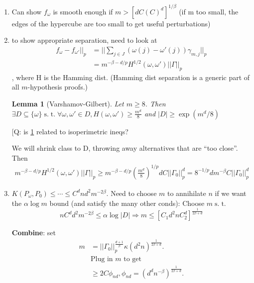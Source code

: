 \documentclass[10pt]{article}
\newtheorem{lemma}[lemma]{Lemma}
\newcommand{\st}{\ensuremath{\;\mathrm{s.}\;\mathrm{t.}\;}}
\begin{document}
\begin{enumerate}
\item Can show $f_\omega$ is smooth enough if $m>\left[dC(C)^d\right]^{1/\beta}$
(if m too small, the edges of the hypercube are too small to get useful perturbations)
\item to show appropriate separation, need to look at 
\begin{align*}
f_\omega-f_{\omega'}||_p &= ||\sum_{j\in J}(\omega(j) - \omega'(j))\gamma_{m,j}||_p\\
&= m^{-\beta-d/p}H^{1/2}(\omega,\omega')||\Gamma||_p
\end{align*}, 
where H is the Hamming dist.
(Hamming dist separation is a generic part of all $m$-hypothesis proofs.)

\begin{lemma}[Varshamov-Gilbert]
\label{vg}
Let $m\geq 8$.  Then $\exists D\subseteq \{\omega\} \st \forall \omega,\omega'\in D,
H(\omega,\omega')\geq \frac{m^d}{8}$ and
$|D|\geq\exp(m^d/8)$
\end{lemma}

[Q: is \ref{vg} related to isoperimetric ineqs?

We will shrink class to D, throwing away alternatives that are ``too close''.
Then 
\begin{align*}
m^{-\beta-d/p}H^{1/2}(\omega,\omega')||\Gamma||_p 
	\geq m^{-\beta-d/p} (\frac{m^d}{8})^{1/p} dC||\Gamma_0||_p^d
	= 8^{-1/p}dm^{-\beta}C||\Gamma_0||_p^d
\end{align*}

\item $K(P_\omega,P_0)\leq\cdots\leq C^dnd^2m^{-2\beta}$.  
Need to choose $m$ to annihilate $n$ if we want the $\alpha\log m$ bound (and satisfy the many other conds):
Choose $m \st$
\[ nC^dd^2m^{-2\beta}\leq \alpha\log |D|
\Rightarrow m\leq \left[C_1d^2nC_2^d\right]^{\frac{1}{2\beta+d}}\]

\textbf{Combine}: set 
\begin{align*}
m&=||\Gamma_0||_p^{\frac{d+1}{\beta}}\kappa(d^2n)^{\frac{1}{2\beta+d}}.\\
&\text{Plug in $m$ to get}\\
& \geq 2C\phi_{nd}, \phi_{nd}=(d^dn^{-\beta})^{\frac{1}{2\beta+d}}.
\end{align*}


\end{enumerate}
	
\end{document}
